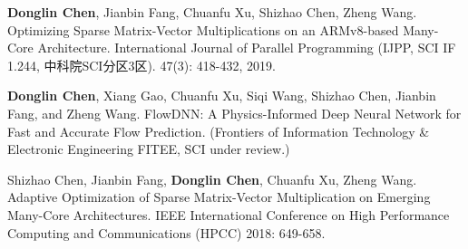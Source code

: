 \begin{resume}
\begin{enumerate}[label={[\arabic*]}]
  \item \textbf{Donglin Chen}, Jianbin Fang, Chuanfu Xu, Shizhao Chen, Zheng Wang. 
  Optimizing Sparse Matrix-Vector Multiplications on an ARMv8-based Many-Core Architecture. 
  International Journal of Parallel Programming (IJPP, SCI IF 1.244, 中科院SCI分区3区). 47(3): 418-432, 2019.
   
  \item \textbf{Donglin Chen}, Xiang Gao, Chuanfu Xu, Siqi Wang, Shizhao Chen, Jianbin Fang, and Zheng Wang. 
  FlowDNN: A Physics-Informed Deep Neural Network for Fast and Accurate Flow Prediction. 
  (Frontiers of Information Technology \& Electronic Engineering FITEE, SCI under review.)
  
  \item Shizhao Chen, Jianbin Fang, \textbf{Donglin Chen}, Chuanfu Xu, Zheng Wang. 
  Adaptive Optimization of Sparse Matrix-Vector Multiplication on Emerging Many-Core Architectures. 
  IEEE International Conference on High Performance Computing and Communications (HPCC) 2018: 649-658.
  


  \end{enumerate}

\fi
\fi
\end{resume}
